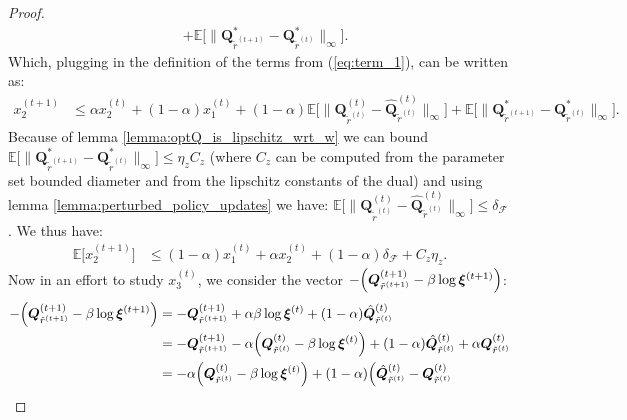 \begin{proof}
\begin{align*}
    &+ \mathbb{E}\Big[ \| 
        \bm{Q}_{\tilde{r}^{(t+1)}}^*  
        - \bm{Q}_{\tilde{r}^{(t)}}^*  
    \|_\infty\Big].
\end{align*}
Which, plugging in the definition of the terms from (\ref{eq:term_1}), can be written as:
\begin{align*}
    x_2^{(t+1)} 
    & \leq \alpha x_2^{(t)}  
    + (1-\alpha) x_1^{(t)}
    + (1-\alpha)  \mathbb{E}\Big[ \|
        {\bm{Q}}^{(t)}_{\tilde{r}^{(t)}} 
        - \hat{\bm{Q}}^{(t)}_{\tilde{r}^{(t)}} 
    \|_\infty \Big]
    + \mathbb{E}\Big[ \| 
        \bm{Q}_{\tilde{r}^{(t+1)}}^*  
        - \bm{Q}_{\tilde{r}^{(t)}}^*  
    \|_\infty\Big].
\end{align*}
Because of lemma \ref{lemma:optQ_is_lipschitz_wrt_w} we can bound $ \mathbb{E}\big[ \| \bm{Q}_{\tilde{r}^{(t+1)}}^*- \bm{Q}_{\tilde{r}^{(t)}}^* \|_\infty \big] \leq \eta_z C_z$ (where $C_z$ can be computed from the parameter set bounded diameter and from the lipschitz constants of the dual) and using lemma \ref{lemma:perturbed_policy_updates} we have: $\mathbb{E}\big[ \|{\bm{Q}}^{(t)}_{\tilde{r}^{(t)}} - \hat{\bm{Q}}^{(t)}_{\tilde{r}^{(t)}} \|_\infty\big] \leq \delta_\mathcal{F}$. We thus have:
\begin{equation}
    \begin{aligned}
        \label{eq:ineq_opt_aux}
        \mathbb{E} \big[ x_2^{(t+1)} \big]
        & \leq (1-\alpha) x_1^{(t)} + \alpha x_2^{(t)}  
        + (1-\alpha) \delta_\mathcal{F} + C_z \eta_z.
    \end{aligned}
\end{equation}
Now in an effort to study $x_3^{(t)}$, we consider the vector  $- \Bigl( \bm{Q}_{\tilde{r}^{(t+1)}}^{(t+1)}  - \beta \log \bm{\xi}^{(t+1)} \Bigr) $:
\begin{align*}
    - \Bigl( \bm{Q}_{\tilde{r}^{(t+1)}}^{(t+1)}  - \beta \log \bm{\xi}^{(t+1)} \Bigr) 
    &= 
    - \bm{Q}_{\tilde{r}^{(t+1)}}^{(t+1)}  
    + \alpha \beta \log \bm{\xi}^{(t)} + (1-\alpha) \hat{\bm{Q}}_{\tilde{r}^{(t)}}^{(t)}
    \\
    &= 
    - \bm{Q}_{\tilde{r}^{(t+1)}}^{(t+1)}  
    - \alpha \Bigl(\bm{Q}^{(t)}_{\tilde{r}^{(t)}} - \beta \log \bm{\xi}^{(t)}  \Bigr)
    + (1-\alpha) \hat{\bm{Q}}_{\tilde{r}^{(t)}}^{(t)}
    + \alpha \bm{Q}^{(t)}_{\tilde{r}^{(t)}}
    \\ 
    &= 
    - \alpha \Bigl(\bm{Q}^{(t)}_{\tilde{r}^{(t)}} - \beta \log \bm{\xi}^{(t)}  \Bigr)
    + (1-\alpha) \Bigl( 
        \hat{\bm{Q}}_{\tilde{r}^{(t)}}^{(t)} 
        - \bm{Q}^{(t)}_{\tilde{r}^{(t)}} 

\end{align*}
\end{proof}
